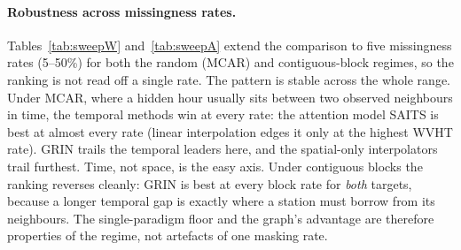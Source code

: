 \documentclass[11pt]{article}
\begin{document}
\begin{table}[t]
\centering
\caption{Imputation mean absolute error (lower is better). Station-outage is the
spatial regime; MCAR-50\% and Block-50\% are temporal regimes. GRIN values are
mean $\pm$ standard deviation over three model seeds. Best per column in bold.}
\label{tab:imp}
\small
{}
\end{table}

\paragraph{Robustness across missingness rates.}
Tables~\ref{tab:sweepW} and~\ref{tab:sweepA} extend the comparison to five
missingness rates (5--50\%) for both the random (MCAR) and contiguous-block
regimes, so the ranking is not read off a single rate. The pattern is stable
across the whole range. Under MCAR, where a hidden hour usually sits between two
observed neighbours in time, the temporal methods win at every rate: the attention
model SAITS is best at almost every rate (linear interpolation edges it only at the
highest WVHT rate). GRIN trails the temporal leaders here, and the spatial-only
interpolators trail furthest. Time, not space, is the easy axis. Under contiguous
blocks the ranking reverses cleanly: GRIN is best at every block rate for \emph{both}
targets, because a longer temporal gap is exactly where a station must borrow from
its neighbours. The single-paradigm floor and the graph's advantage are therefore
properties of the regime, not artefacts of one masking rate.
\end{document}
